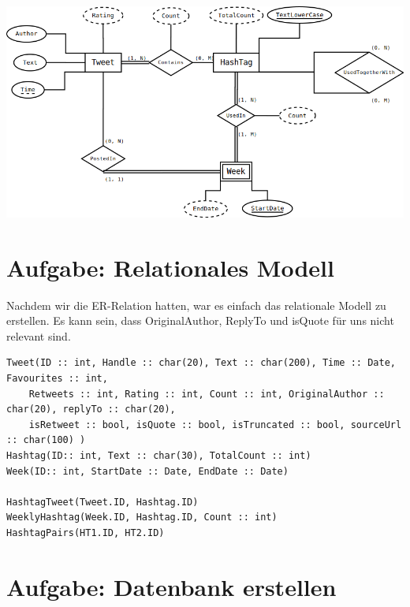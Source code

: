 \vspace{1cm}
\includegraphics[width=\textwidth]{ERDiagramm.png}

\newpage

\section{Aufgabe: Relationales Modell}

Nachdem wir die ER-Relation hatten, war es einfach das relationale Modell zu erstellen. Es kann sein, dass OriginalAuthor, ReplyTo und isQuote für uns nicht relevant sind.

\begin{verbatim}
Tweet(ID :: int, Handle :: char(20), Text :: char(200), Time :: Date, Favourites :: int, 
    Retweets :: int, Rating :: int, Count :: int, OriginalAuthor :: char(20), replyTo :: char(20), 
    isRetweet :: bool, isQuote :: bool, isTruncated :: bool, sourceUrl :: char(100) )
Hashtag(ID:: int, Text :: char(30), TotalCount :: int)
Week(ID:: int, StartDate :: Date, EndDate :: Date)

HashtagTweet(Tweet.ID, Hashtag.ID)
WeeklyHashtag(Week.ID, Hashtag.ID, Count :: int)
HashtagPairs(HT1.ID, HT2.ID)

\end{verbatim}

\section{Aufgabe: Datenbank erstellen}
	

